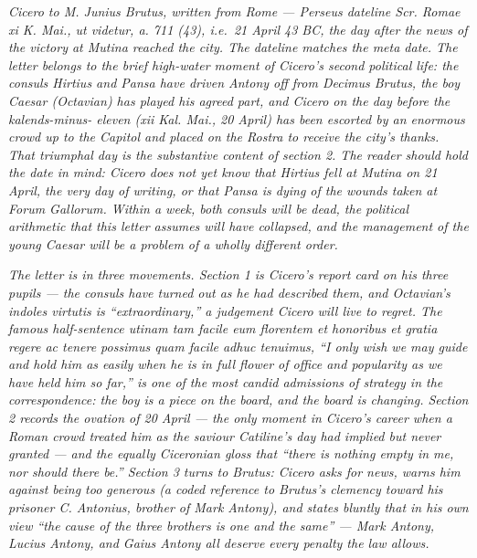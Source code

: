 
\textit{Cicero to M. Junius Brutus, written from Rome ---
Perseus dateline \textit{Scr. Romae xi K. Mai., ut videtur,
a. 711 (43)}, i.e.\ 21 April 43 BC, the day after the news
of the victory at Mutina reached the city. The dateline
matches the meta date. The letter belongs to the brief
high-water moment of Cicero's second political life: the
consuls Hirtius and Pansa have driven Antony off from
Decimus Brutus, the boy Caesar (Octavian) has played his
agreed part, and Cicero on the day before the kalends-minus-
eleven (xii Kal. Mai., 20 April) has been escorted by an
enormous crowd up to the Capitol and placed on the Rostra
to receive the city's thanks. That triumphal day is the
substantive content of section 2. The reader should hold
the date in mind: Cicero does not yet know that Hirtius
fell at Mutina on 21 April, the very day of writing, or
that Pansa is dying of the wounds taken at Forum Gallorum.
Within a week, both consuls will be dead, the political
arithmetic that this letter assumes will have collapsed,
and the management of the young Caesar will be a problem
of a wholly different order.}

\textit{The letter is in three movements. Section 1 is
Cicero's report card on his three pupils --- the consuls
have turned out as he had described them, and Octavian's
\textit{indoles virtutis} is ``extraordinary,'' a judgement
Cicero will live to regret. The famous half-sentence
\textit{utinam tam facile eum florentem et honoribus et
gratia regere ac tenere possimus quam facile adhuc
tenuimus}, ``I only wish we may guide and hold him as
easily when he is in full flower of office and popularity
as we have held him so far,'' is one of the most candid
admissions of strategy in the correspondence: the boy is
a piece on the board, and the board is changing. Section
2 records the ovation of 20 April --- the only moment in
Cicero's career when a Roman crowd treated him as the
saviour Catiline's day had implied but never granted ---
and the equally Ciceronian gloss that ``there is nothing
empty in me, nor should there be.'' Section 3 turns to
Brutus: Cicero asks for news, warns him against being too
generous (a coded reference to Brutus's clemency toward
his prisoner C. Antonius, brother of Mark Antony), and
states bluntly that in his own view ``the cause of the
three brothers is one and the same'' --- Mark Antony,
Lucius Antony, and Gaius Antony all deserve every
penalty the law allows.}
